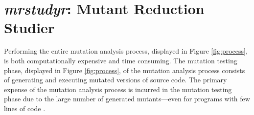 

\section{\textit{mrstudyr}: Mutant Reduction Studier}

Performing the entire mutation analysis process, displayed in Figure \ref{fig:process},
is both computationally expensive and time consuming. The mutation testing
phase, displayed in Figure \ref{fig:process}, of the mutation analysis
process consists of generating and executing mutated versions of source code. The primary
expense of the mutation analysis process is incurred in the mutation testing phase
due to the large number of generated mutants---even for programs with few lines of code \cite{offutt2001mutation}.




